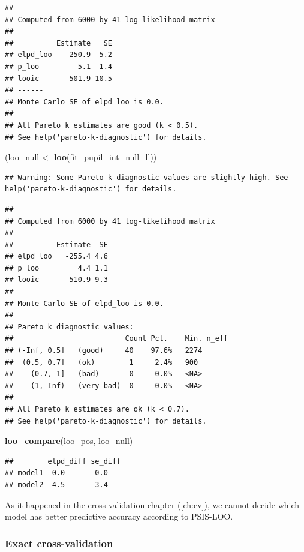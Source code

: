 \documentclass[12pt,]{krantz}
\newenvironment{Shaded}{\begin{snugshade}}{\end{snugshade}}
\newcommand{\KeywordTok}[1]{\textcolor[rgb]{0.13,0.29,0.53}{\textbf{#1}}}
\newcommand{\StringTok}[1]{\textcolor[rgb]{0.31,0.60,0.02}{#1}}
\newcommand{\NormalTok}[1]{#1}
\theoremstyle{definition}
\theoremstyle{definition}
\theoremstyle{definition}
\theoremstyle{remark}
\begin{document}
\begin{verbatim}
## 
## Computed from 6000 by 41 log-likelihood matrix
## 
##          Estimate   SE
## elpd_loo   -250.9  5.2
## p_loo         5.1  1.4
## looic       501.9 10.5
## ------
## Monte Carlo SE of elpd_loo is 0.0.
## 
## All Pareto k estimates are good (k < 0.5).
## See help('pareto-k-diagnostic') for details.
\end{verbatim}

\begin{Shaded}
\begin{Highlighting}[]
\NormalTok{(loo_null <-}\StringTok{ }\KeywordTok{loo}\NormalTok{(fit_pupil_int_null_ll))}
\end{Highlighting}
\end{Shaded}

\begin{verbatim}
## Warning: Some Pareto k diagnostic values are slightly high. See help('pareto-k-diagnostic') for details.
\end{verbatim}

\begin{verbatim}
## 
## Computed from 6000 by 41 log-likelihood matrix
## 
##          Estimate  SE
## elpd_loo   -255.4 4.6
## p_loo         4.4 1.1
## looic       510.9 9.3
## ------
## Monte Carlo SE of elpd_loo is 0.0.
## 
## Pareto k diagnostic values:
##                          Count Pct.    Min. n_eff
## (-Inf, 0.5]   (good)     40    97.6%   2274      
##  (0.5, 0.7]   (ok)        1     2.4%   900       
##    (0.7, 1]   (bad)       0     0.0%   <NA>      
##    (1, Inf)   (very bad)  0     0.0%   <NA>      
## 
## All Pareto k estimates are ok (k < 0.7).
## See help('pareto-k-diagnostic') for details.
\end{verbatim}

\begin{Shaded}
\begin{Highlighting}[]
\KeywordTok{loo_compare}\NormalTok{(loo_pos, loo_null)}
\end{Highlighting}
\end{Shaded}

\begin{verbatim}
##        elpd_diff se_diff
## model1  0.0       0.0   
## model2 -4.5       3.4
\end{verbatim}

As it happened in the cross validation chapter (\ref{ch:cv}), we cannot
decide which model has better predictive accuracy according to PSIS-LOO.

\subsubsection{Exact cross-validation}\label{exact-cross-validation}
\end{document}
